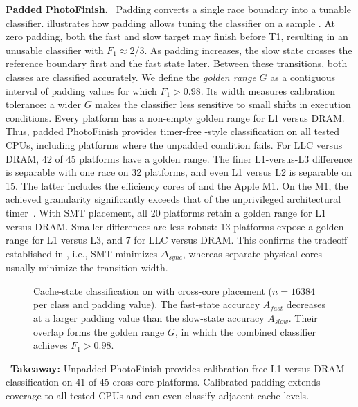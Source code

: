 \documentclass[letterpaper,twocolumn,10pt]{article} %
\newcommand{\paragrabf}[1]{\noindent \textbf{#1.}\ }
\newcommand{\AttackName}{PhotoFinish\xspace}
\newcommand{\tref}{{\fontfamily{cmtt}\selectfont T1}\xspace}
\newcommand{\rdelta}[1]{$\Delta_{#1}$}
\newcommand{\takeaway}[1]{%
\begin{tcolorbox}[boxsep=1pt,left=2pt,right=2pt,top=1pt,bottom=1pt]
    \faLightbulb[regular]~\textbf{Takeaway:} #1
\end{tcolorbox}
}
\begin{document}
\paragrabf{Padded \AttackName}
Padding converts a single race boundary into a tunable classifier.
 illustrates how padding allows tuning the classifier on a sample \labthirtythreeCPU.
At zero padding, both the fast and slow target may finish before \tref, resulting in an unusable classifier with $F_1\approx 2/3$.
As padding increases, the slow state crosses the reference boundary first and the fast state later.
Between these transitions, both classes are classified accurately.
We define the \emph{golden range} $G$ as a contiguous interval of padding values for which $F_1>0.98$.
Its width measures calibration tolerance: a wider $G$ makes the classifier less sensitive to small shifts in execution conditions.
Every platform has a non-empty golden range for L1 versus DRAM\@.
Thus, padded \AttackName provides timer-free \FlushReload-style classification on all tested CPUs, including platforms where the unpadded condition fails.
For LLC versus DRAM, \num{42} of \num{45} platforms have a golden range.
The finer L1-versus-L3 difference is separable with one race on \num{32} platforms, and even L1 versus L2 is separable on \num{15}.
The latter includes the efficiency cores of \labseventytwoCPU and the Apple M1.
On the M1, the achieved granularity significantly exceeds that of the unprivileged architectural timer~\cite{ARM2021GenericTimer,Lipp2016}.
With SMT placement, all \num{20} platforms retain a golden range for L1 versus DRAM.
Smaller differences are less robust: \num{13} platforms expose a golden range for L1 versus L3, and \num{7} for LLC versus DRAM.
This confirms the tradeoff established in , i.e., SMT minimizes \rdelta{sync}, whereas separate physical cores usually minimize the transition width.

\begin{figure}[t]
  \centering
  
  \caption{Cache-state classification on \labthirtythreeCPU with cross-core placement ($n=16384$ per class and padding value). The fast-state accuracy $A_{fast}$ decreases at a larger padding value than the slow-state accuracy $A_{slow}$. Their overlap forms the golden range $G$, in which the combined classifier achieves $F_1>0.98$.}
  \label{fig:padding-results}
\end{figure}

\takeaway{Unpadded \AttackName provides calibration-free L1-versus-DRAM classification on \num{41} of \num{45} cross-core platforms. Calibrated padding extends coverage to all tested CPUs and can even classify adjacent cache levels.}
\end{document}
